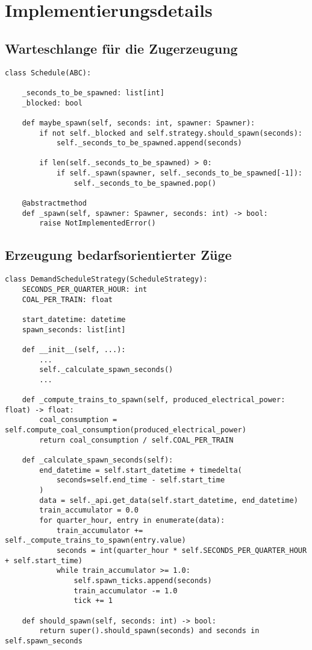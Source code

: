 \section{Implementierungsdetails}

\subsection{Warteschlange für die Zugerzeugung}

\lstset{language=python}
\begin{lstlisting}[caption={Quelltextunterschrift}, label=code:template-method-code]
class Schedule(ABC):

    _seconds_to_be_spawned: list[int]
    _blocked: bool

    def maybe_spawn(self, seconds: int, spawner: Spawner):
        if not self._blocked and self.strategy.should_spawn(seconds):
            self._seconds_to_be_spawned.append(seconds)

        if len(self._seconds_to_be_spawned) > 0:
            if self._spawn(spawner, self._seconds_to_be_spawned[-1]):
                self._seconds_to_be_spawned.pop()

    @abstractmethod
    def _spawn(self, spawner: Spawner, seconds: int) -> bool:
    	raise NotImplementedError()
\end{lstlisting}

\subsection{Erzeugung bedarfsorientierter Züge}

\lstset{language=python}
\begin{lstlisting}[caption={Quelltextunterschrift}, label=code:template-method-code]
class DemandScheduleStrategy(ScheduleStrategy):
    SECONDS_PER_QUARTER_HOUR: int
    COAL_PER_TRAIN: float

    start_datetime: datetime
    spawn_seconds: list[int]

    def __init__(self, ...):
        ...
        self._calculate_spawn_seconds()
        ...

    def _compute_trains_to_spawn(self, produced_electrical_power: float) -> float:
        coal_consumption = self.compute_coal_consumption(produced_electrical_power)
        return coal_consumption / self.COAL_PER_TRAIN

    def _calculate_spawn_seconds(self):
        end_datetime = self.start_datetime + timedelta(
            seconds=self.end_time - self.start_time
        )
        data = self._api.get_data(self.start_datetime, end_datetime)
        train_accumulator = 0.0
        for quarter_hour, entry in enumerate(data):
            train_accumulator += self._compute_trains_to_spawn(entry.value)
            seconds = int(quarter_hour * self.SECONDS_PER_QUARTER_HOUR + self.start_time)
            while train_accumulator >= 1.0:
                self.spawn_ticks.append(seconds)
                train_accumulator -= 1.0
                tick += 1

	def should_spawn(self, seconds: int) -> bool:
    	return super().should_spawn(seconds) and seconds in self.spawn_seconds
\end{lstlisting}